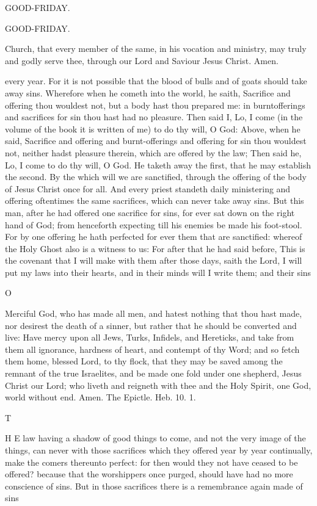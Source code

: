 GOOD-FRIDAY.

GOOD-FRIDAY.

Church, that every member of the same, in his vocation and ministry, may truly and godly serve thee, through our Lord and Saviour Jesus Christ. Amen.

every year. For it is not possible that the blood of bulls and of goats should take away sins. Wherefore when he cometh into the world, he saith, Sacrifice and offering thou wouldest not, but a body hast thou prepared me: in burntofferings and sacrifices for sin thou hast had no pleasure. Then said I, Lo, I come (in the volume of the book it is written of me) to do thy will, O God: Above, when he said, Sacrifice and offering and burnt-offerings and offering for sin thou wouldest not, neither hadst pleasure therein, which are offered by the law; Then said he, Lo, I come to do thy will, O God. He taketh away the first, that he may establish the second. By the which will we are sanctified, through the offering of the body of Jesus Christ once for all. And every priest standeth daily ministering and offering oftentimes the same sacrifices, which can never take away sins. But this man, after he had offered one sacrifice for sins, for ever sat down on the right hand of God; from henceforth expecting till his enemies be made his foot-stool. For by one offering he hath perfected for ever them that are sanctified: whereof the Holy Ghost also is a witness to us: For after that he had said before, This is the covenant that I will make with them after those days, saith the Lord, I will put my laws into their hearts, and in their minds will I write them; and their sins

O

Merciful God, who has made all men, and hatest nothing that thou hast made, nor desirest the death of a sinner, but rather that he should be converted and live: Have mercy upon all Jews, Turks, Infidels, and Hereticks, and take from them all ignorance, hardness of heart, and contempt of thy Word; and so fetch them home, blessed Lord, to thy flock, that they may be saved among the remnant of the true Israelites, and be made one fold under one shepherd, Jesus Christ our Lord; who liveth and reigneth with thee and the Holy Spirit, one God, world without end. Amen. The Epictle. Heb. 10. 1.

T

H E law having a shadow of good things to come, and not the very image of the things, can never with those sacrifices which they offered year by year continually, make the comers thereunto perfect: for then would they not have ceased to be offered? because that the worshippers once purged, should have had no more conscience of sins. But in those sacrifices there is a remembrance again made of sins

